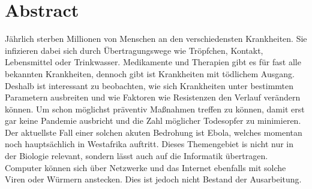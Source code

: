 \section*{Abstract}
Jährlich sterben Millionen von Menschen an den verschiedensten Krankheiten. Sie infizieren dabei sich durch Übertragungswege wie Tröpfchen, Kontakt, Lebensmittel oder Trinkwasser. Medikamente und Therapien gibt es für fast alle bekannten Krankheiten, dennoch gibt ist Krankheiten mit tödlichem Ausgang. Deshalb ist interessant zu beobachten, wie sich Krankheiten unter bestimmten Parametern ausbreiten und wie Faktoren wie Resistenzen den Verlauf verändern können. Um schon möglichst präventiv Maßnahmen treffen zu können, damit erst gar keine Pandemie ausbricht und die Zahl möglicher Todesopfer zu minimieren. Der aktuellste Fall einer solchen akuten Bedrohung ist Ebola, welches momentan noch hauptsächlich in Westafrika auftritt. Dieses Themengebiet is nicht nur in der Biologie relevant, sondern lässt auch auf die Informatik übertragen. Computer können sich über Netzwerke und das Internet ebenfalls mit solche Viren oder Würmern anstecken. Dies ist jedoch nicht Bestand der Ausarbeitung.